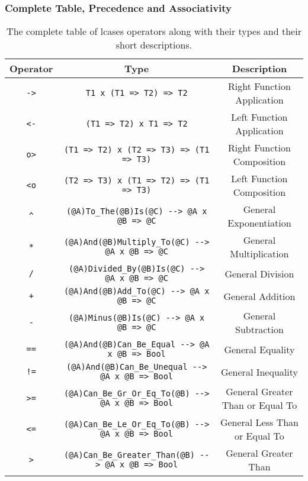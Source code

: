 \documentclass{article}
\begin{document}
\newpage
\subsubsection{Complete Table, Precedence and Associativity}

\begin{table}[h]

\caption{
The complete table of lcases operators along with their types and 
their short descriptions.
}

\begin{center}
\begin{tabular}{ |c|c|c| } 
\hline
Operator & Type & Description
\\ 
\hline
\hline
\verb|->| & \verb|T1 x (T1 => T2) => T2| & Right Function Application
\\
\hline
\verb|<-| & \verb|(T1 => T2) x T1 => T2| & Left Function Application
\\
\hline
\verb|o>| & \verb|(T1 => T2) x (T2 => T3) => (T1 => T3)| &
Right Function Composition
\\
\hline
\verb|<o| & \verb|(T2 => T3) x (T1 => T2) => (T1 => T3)| &
Left Function Composition
\\
\hline
\verb|^| & \verb|(@A)To_The(@B)Is(@C) --> @A x @B => @C| &
General Exponentiation
\\
\hline
\verb|*| & \verb|(@A)And(@B)Multiply_To(@C) --> @A x @B => @C| &
General Multiplication
\\
\hline
\verb|/| & \verb|(@A)Divided_By(@B)Is(@C) --> @A x @B => @C| &
General Division
\\
\hline
\verb|+| & \verb|(@A)And(@B)Add_To(@C) --> @A x @B => @C| &
General Addition
\\ 
\hline
\verb|-| & \verb|(@A)Minus(@B)Is(@C) --> @A x @B => @C| &
General Subtraction
\\
\hline
\verb|==| & \verb|(@A)And(@B)Can_Be_Equal --> @A x @B => Bool| &
General Equality
\\
\hline
\verb|!=| & \verb|(@A)And(@B)Can_Be_Unequal --> @A x @B => Bool| &
General Inequality
\\
\hline
\verb|>=| & \verb|(@A)Can_Be_Gr_Or_Eq_To(@B) --> @A x @B => Bool| &
General Greater Than or Equal To
\\
\hline
\verb|<=| & \verb|(@A)Can_Be_Le_Or_Eq_To(@B) --> @A x @B => Bool| &
General Less Than or Equal To
\\
\hline
\verb|>| & \verb|(@A)Can_Be_Greater_Than(@B) --> @A x @B => Bool| &
General Greater Than
\\
\hline

\end{tabular}
\end{center}
\end{table}
\end{document}
